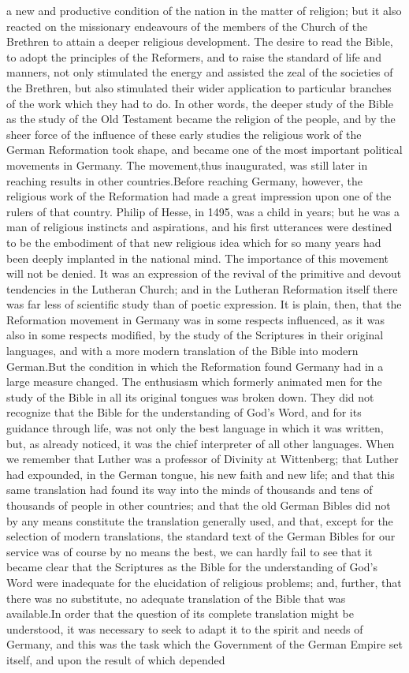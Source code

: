 \documentclass[a4paper]{article}
\begin{document}
a new and productive condition of the nation in the matter of religion; but it also reacted on the missionary endeavours of the members of the Church of the Brethren to attain a deeper religious development. The desire to read the Bible, to adopt the principles of the Reformers, and to raise the standard of life and manners, not only stimulated the energy and assisted the zeal of the societies of the Brethren, but also stimulated their wider application to particular branches of the work which they had to do. In other words, the deeper study of the Bible as the study of the Old Testament became the religion of the people, and by the sheer force of the influence of these early studies the religious work of the German Reformation took shape, and became one of the most important political movements in Germany. The movement,thus inaugurated, was still later in reaching results in other countries.Before reaching Germany, however, the religious work of the Reformation had made a great impression upon one of the rulers of that country. Philip of Hesse, in 1495, was a child in years; but he was a man of religious instincts and aspirations, and his first utterances were destined to be the embodiment of that new religious idea which for so many years had been deeply implanted in the national mind. The importance of this movement will not be denied. It was an expression of the revival of the primitive and devout tendencies in the Lutheran Church; and in the Lutheran Reformation itself there was far less of scientific study than of poetic expression. It is plain, then, that the Reformation movement in Germany was in some respects influenced, as it was also in some respects modified, by the study of the Scriptures in their original languages, and with a more modern translation of the Bible into modern German.But the condition in which the Reformation found Germany had in a large measure changed. The enthusiasm which formerly animated men for the study of the Bible in all its original tongues was broken down. They did not recognize that the Bible for the understanding of God's Word, and for its guidance through life, was not only the best language in which it was written, but, as already noticed, it was the chief interpreter of all other languages. When we remember that Luther was a professor of Divinity at Wittenberg; that Luther had expounded, in the German tongue, his new faith and new life; and that this same translation had found its way into the minds of thousands and tens of thousands of people in other countries; and that the old German Bibles did not by any means constitute the translation generally used, and that, except for the selection of modern translations, the standard text of the German Bibles for our service was of course by no means the best, we can hardly fail to see that it became clear that the Scriptures as the Bible for the understanding of God's Word were inadequate for the elucidation of religious problems; and, further, that there was no substitute, no adequate translation of the Bible that was available.In order that the question of its complete translation might be understood, it was necessary to seek to adapt it to the spirit and needs of Germany, and this was the task which the Government of the German Empire set itself, and upon the result of which depended 
\end{document}
